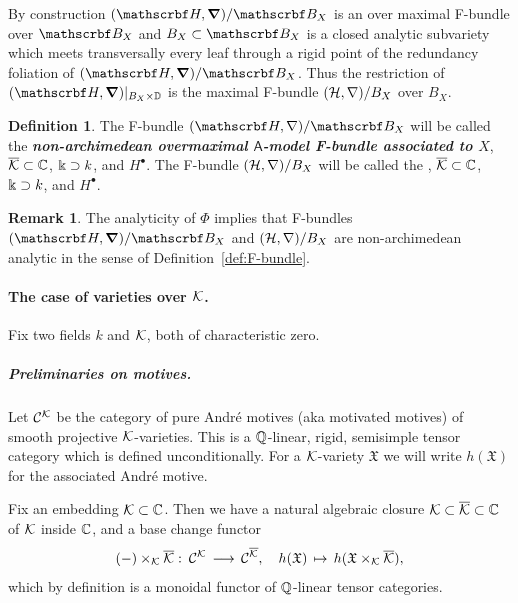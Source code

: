 \documentclass[twoside,leqno]{article}
\numberwithin{equation}{section}
\theoremstyle{plain}
\theoremstyle{definition}
\newtheorem{definition}[equation]{Definition}
\newtheorem{remark}[equation]{Remark}
\begin{document}
By construction $(\omH,\bnabla)/\omB_{X}$ is an over maximal F-bundle over $\omB_{X}$ and 
$B_{X} \subset \omB_{X}$ is a closed analytic subvariety which meets transversally every leaf through a rigid point of the redundancy foliation of $(\omH,\bnabla)/\omB_{X}$. Thus  the restriction of $(\omH,\bnabla)|_{B_{X}\times \bbD}$ is the maximal F-bundle $(\mathcal H,\nabla)/B_{X}$ over $B_{X}$.

\begin{definition} \label{def:nonarchF}
The F-bundle $(\omH,\nabla)/\omB_{X}$ will be called the \emph{\bfseries
non-archimedean overmaximal $\mathsf{A}$-model F-bundle associated
to $X$}, $\overline{\mathcal K} \subset \mathbb C$, $\Bbbk \supset k$, and $H^{\bullet}$.  The F-bundle $(\mathcal H,\nabla)/B_{X}$
will be called the , $\overline{\mathcal K} \subset \mathbb C$, 
$\Bbbk \supset k$, and $H^{\bullet}$.
\end{definition}

\begin{remark} \label{rem:formal_in_u}
The analyticity of $\Phi$ implies that F-bundles $(\omH,\bnabla)/\omB_{X}$ and $(\mathcal H,\nabla)/B_{X}$ are non-archimedean analytic in the sense of Definition~\ref{def:F-bundle}.
\end{remark}

\paragraph{The case of varieties over $\mathcal K$.}  \label{par:casekay}
Fix two fields $k$ and $\mathcal K$, both of characteristic zero.

\subparagraph{Preliminaries on motives.} \label{subpar:motivess}
Let $\mathcal{C}^{\mathcal K}$ be the category of pure Andr\'{e} motives (aka
motivated motives)
\cite{Andre_Pour_une_theorie_inconditionnelle_des_motifs} of smooth
projective $\mathcal K$-varieties. This is a $\mathbb Q$-linear, rigid,
semisimple tensor category which is defined unconditionally.  For a
$\mathcal K$-variety $\mathfrak{X}$ we will write 
$h(\mathfrak{X})$ for the associated Andr\'{e} motive.


Fix an embedding $\mathcal K \subset  \mathbb C$. Then we
have a natural algebraic closure $\mathcal K \subset \overline{\mathcal K} \subset \mathbb C$
of $\mathcal K$ inside $\mathbb C$, and a base change functor
\[
(-)\times_{\mathcal K} \overline{\mathcal K} \, \colon \, \mathcal{C}^{\mathcal K} \, \longrightarrow \, \mathcal{C}^{\overline{\mathcal K}},
\quad h(\mathfrak{X}) \, \mapsto \, h(\mathfrak{X}\times_{\mathcal K} \overline{\mathcal K}),
\]
which by definition is a monoidal functor of $\mathbb Q$-linear tensor
categories.
\end{document}
